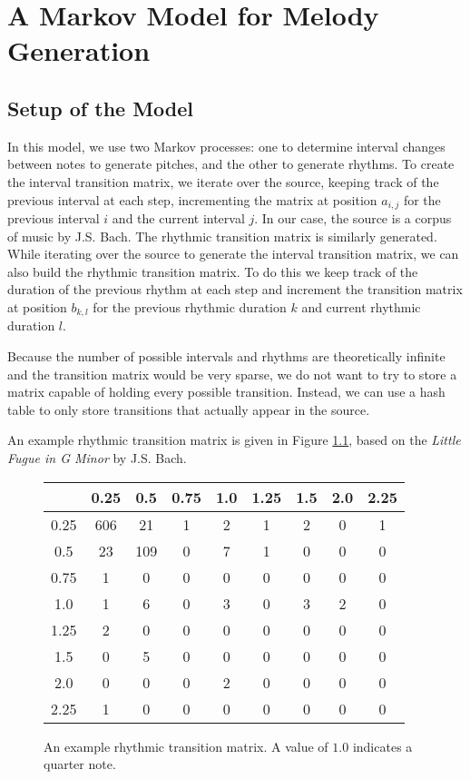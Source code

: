 \chapter{A Markov Model for Melody Generation} \label{markov}

\section{Setup of the Model} \label{markov:setup}

In this model, we use two Markov processes: one to determine interval changes between notes to generate pitches, and the other to generate rhythms.
To create the interval transition matrix, we iterate over the source, keeping track of the previous interval at each step, incrementing the matrix at position $a_{i,j}$ for the previous interval $i$ and the current interval $j$.
In our case, the source is a corpus of music by J.S. Bach.
The rhythmic transition matrix is similarly generated.
While iterating over the source to generate the interval transition matrix, we can also build the rhythmic transition matrix.
To do this we keep track of the duration of the previous rhythm at each step and increment the transition matrix at position $b_{k,l}$ for the previous rhythmic duration $k$ and current rhythmic duration $l$.

Because the number of possible intervals and rhythms are theoretically infinite and the transition matrix would be very sparse, we do not want to try to store a matrix capable of holding every possible transition.
Instead, we can use a hash table to only store transitions that actually appear in the source.

An example rhythmic transition matrix is given in Figure \ref{fig:rhythmTransitionMatrix}, based on the \textit{Little Fugue in G Minor} by J.S. Bach.

\begin{figure}
	\centering
	\begin{tabular}{c | c c c c c c c c}
		& 0.25 & 0.5 & 0.75 & 1.0 & 1.25 & 1.5 & 2.0 & 2.25\\
		\hline
		0.25 & 606 & 21 & 1 & 2 & 1 & 2 & 0 & 1\\
		0.5 & 23 & 109 & 0 & 7 & 1 & 0 & 0 & 0\\
		0.75 & 1 & 0 & 0 & 0 & 0 & 0 & 0 & 0\\
		1.0 & 1 & 6 & 0 & 3 & 0 & 3 & 2 & 0\\
		1.25 & 2 & 0 & 0 & 0 & 0 & 0 & 0 & 0\\
		1.5 & 0 & 5 & 0 & 0 & 0 & 0 & 0 & 0\\
		2.0 & 0 & 0 & 0 & 2 & 0 & 0 & 0 & 0\\
		2.25 & 1 & 0 & 0 & 0 & 0 & 0 & 0 & 0
	\end{tabular}
	\caption{An example rhythmic transition matrix. A value of $1.0$ indicates a quarter note.}
	\label{fig:rhythmTransitionMatrix}
\end{figure}

